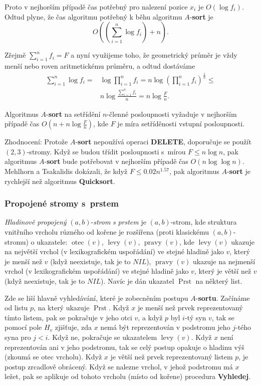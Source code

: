 \documentclass[a4paper,12pt]{article}
\DeclareMathOperator*{\otec}{otec}
\DeclareMathOperator*{\levy}{levy}
\DeclareMathOperator*{\pravy}{pravy}
\DeclareMathOperator*{\Prst}{Prst}
\begin{document}
Proto v nejhorším případě čas potřebný pro nalezení 
pozice $x_i$ je $O(\log f_i)$. Odtud plyne, že čas algoritmu potřebný k 
běhu algoritmu $A$-{\bf sort} je 
$$O((\sum_{i=1}^n\log f_i)+n).$$

Zřejmě $\sum_{i=1}^nf_i=F$ a nyní využijeme toho, že geometrický 
průměr je vždy menší nebo roven aritmetickému 
průměru, a odtud dostáváme 
\begin{align*}\sum_{i=1}^n\log f_i=&\log\prod_{i=1}^nf_i=n\log(\prod_{i
=1}^nf_i)^{\frac 1n}\le\\
&n\log\frac {\sum_{i=1}^nf_i}n=n\log\frac Fn.\end{align*}

\begin{veta}Algoritmus $A$-{\bf sort} na setřídění $
n$-členné 
posloupnosti vyžaduje v nejhorším případě čas 
$O(n+n\log\frac Fn)$, kde $F$ je míra setříděnosti vstupní 
posloupnosti.
\end{veta}

Zhodnocení: Protože $A$-{\bf sort} nepoužívá operaci 
{\bf DELETE}, doporučuje se použít $(2,3)$-stromy. Když se 
budou třídit posloupnosti s~mírou $F\le n\log n$, pak 
algoritmus $A$-{\bf sort} bude potře\-bo\-vat v nejhorším případě 
čas $O(n\log\log n)$. Mehlhorn a Tsa\-kalidis dokázali, že když 
$F\le 0.02n^{1.57}$, pak algoritmus $A$-{\bf sort} je rychlejší než 
algoritmus {\bf Quicksort}.

\subsubsection{Propojené stromy s~prstem}

\emph{Hladinově} \emph{propojený} $(a,b)$-\emph{strom} \emph{s} 
\emph{prstem} je $(a,b)$-strom, kde struktura vnitřního 
vrcholu různého od kořene je 
rozšířena (proti klasickému $(a,b)$-stromu) o 
ukazatele:\newline 
$\otec(v)$, $\levy(v)$, $\pravy(v)$, kde\newline 
$\levy(v)$ ukazuje na největší vrchol (v lexikografic\-kém 
uspořá\-dá\-ní) ve stejné hladině jako $v$, který je menší než 
$v$ (když neexistuje, tak je to $NIL$),\newline 
$\pravy(v)$ ukazuje na nejmenší vrchol (v lexikografic\-kém 
uspořá\-dá\-ní) ve stejné hladině jako $v$, který je větší než 
$v$ (když ne\-existuje, tak je to $NIL$).\newline 
Navíc je dán ukazatel 
$\Prst$ na některý list. 

Zde se liší hlavně vyhledávání, které je zobecněním 
postupu $A$-{\bf sortu}. Začínáme od listu $p$, na který ukazuje 
$\Prst$. Když $x$ je menší než prvek reprezentovaný tímto 
listem, pak se pokračuje v jeho otci $v$, a když $p$ 
byl $i$-tý syn $v$, tak se pomocí pole $H_v$ zjišťuje, zda $
x$ 
nemá být reprezentován v podstromu jeho $j$-tého syna pro 
$j<i$. Když ne, pokračuje se  ukazatelem $\levy(v)$. 
Když $x$ není reprezentován ani v jeho podstromu, 
tak se celý postup opakuje o hladinu výš (zkoumá se otec vrcholu). 
Když $x$ je větší než prvek reprezentovaný listem $
p$, 
je postup zrcadlově obrácený. Když se nalezne 
vrchol, v jehož podstromu má $x$ ležet, pak se aplikuje od 
tohoto vrcholu (místo od kořene) procedura {\bf Vyhledej}.
\end{document}
